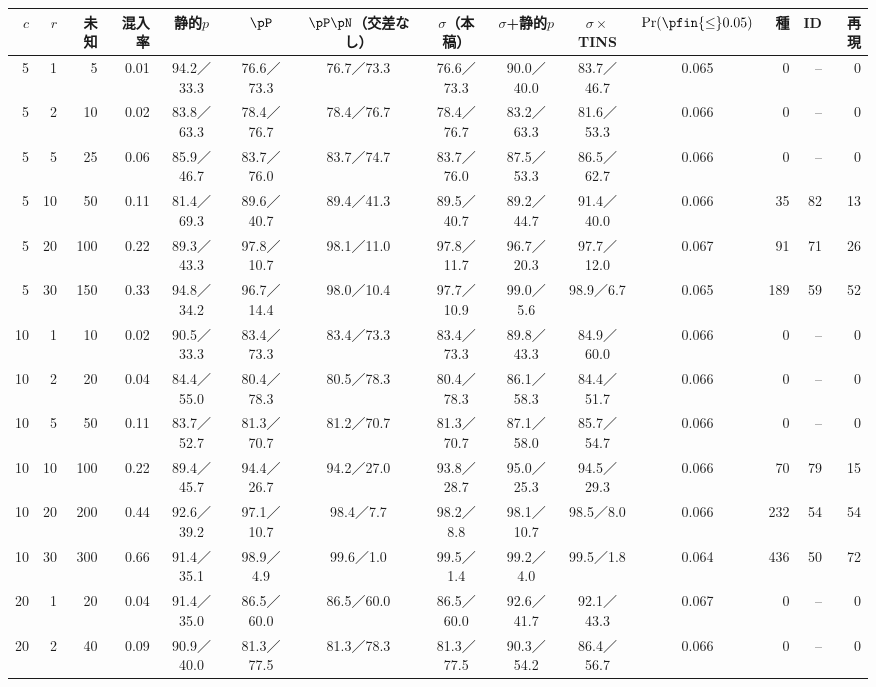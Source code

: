 {\fontsize{6.0pt}{7.1pt}\selectfont\renewcommand{\arraystretch}{1.0}%
\setlength{\tabcolsep}{1.4pt}\begin{tabular}{@{}rrrr|cccccc|c|rrr@{}}
\hline
\rule[-2.0pt]{0pt}{8.2pt}$c$ & $r$ & 未知 & 混入率 & 静的$p$ & $\pP$ & $\pP\pN$（交差なし） & $\sigma$（本稿） & $\sigma$+静的$p$ & $\sigma\times$TINS & $\Pr(\pfin{\le}0.05)$ & 種 & ID & 再現 \\
\hline
5 & 1 & 5 & 0.01 & 94.2／33.3 & 76.6／73.3 & 76.7／73.3 & 76.6／73.3 & 90.0／40.0 & 83.7／46.7 & 0.065 & 0 & -- & 0 \\
5 & 2 & 10 & 0.02 & 83.8／63.3 & 78.4／76.7 & 78.4／76.7 & 78.4／76.7 & 83.2／63.3 & 81.6／53.3 & 0.066 & 0 & -- & 0 \\
5 & 5 & 25 & 0.06 & 85.9／46.7 & 83.7／76.0 & 83.7／74.7 & 83.7／76.0 & 87.5／53.3 & 86.5／62.7 & 0.066 & 0 & -- & 0 \\
5 & 10 & 50 & 0.11 & 81.4／69.3 & 89.6／40.7 & 89.4／41.3 & 89.5／40.7 & 89.2／44.7 & 91.4／40.0 & 0.066 & 35 & 82 & 13 \\
5 & 20 & 100 & 0.22 & 89.3／43.3 & 97.8／10.7 & 98.1／11.0 & 97.8／11.7 & 96.7／20.3 & 97.7／12.0 & 0.067 & 91 & 71 & 26 \\
5 & 30 & 150 & 0.33 & 94.8／34.2 & 96.7／14.4 & 98.0／10.4 & 97.7／10.9 & 99.0／5.6 & 98.9／6.7 & 0.065 & 189 & 59 & 52 \\
10 & 1 & 10 & 0.02 & 90.5／33.3 & 83.4／73.3 & 83.4／73.3 & 83.4／73.3 & 89.8／43.3 & 84.9／60.0 & 0.066 & 0 & -- & 0 \\
10 & 2 & 20 & 0.04 & 84.4／55.0 & 80.4／78.3 & 80.5／78.3 & 80.4／78.3 & 86.1／58.3 & 84.4／51.7 & 0.066 & 0 & -- & 0 \\
10 & 5 & 50 & 0.11 & 83.7／52.7 & 81.3／70.7 & 81.2／70.7 & 81.3／70.7 & 87.1／58.0 & 85.7／54.7 & 0.066 & 0 & -- & 0 \\
10 & 10 & 100 & 0.22 & 89.4／45.7 & 94.4／26.7 & 94.2／27.0 & 93.8／28.7 & 95.0／25.3 & 94.5／29.3 & 0.066 & 70 & 79 & 15 \\
10 & 20 & 200 & 0.44 & 92.6／39.2 & 97.1／10.7 & 98.4／7.7 & 98.2／8.8 & 98.1／10.7 & 98.5／8.0 & 0.066 & 232 & 54 & 54 \\
10 & 30 & 300 & 0.66 & 91.4／35.1 & 98.9／4.9 & 99.6／1.0 & 99.5／1.4 & 99.2／4.0 & 99.5／1.8 & 0.064 & 436 & 50 & 72 \\
20 & 1 & 20 & 0.04 & 91.4／35.0 & 86.5／60.0 & 86.5／60.0 & 86.5／60.0 & 92.6／41.7 & 92.1／43.3 & 0.067 & 0 & -- & 0 \\
20 & 2 & 40 & 0.09 & 90.9／40.0 & 81.3／77.5 & 81.3／78.3 & 81.3／77.5 & 90.3／54.2 & 86.4／56.7 & 0.066 & 0 & -- & 0 \\

\end{tabular}}
